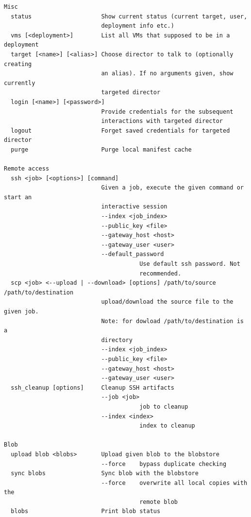\begin{adjustwidth}{2.5em}{2.5em}
\begin{verbatim}
Misc
  status                    Show current status (current target, user, 
                            deployment info etc.) 
  vms [<deployment>]        List all VMs that supposed to be in a deployment 
  target [<name>] [<alias>] Choose director to talk to (optionally creating 
                            an alias). If no arguments given, show currently 
                            targeted director 
  login [<name>] [<password>] 
                            Provide credentials for the subsequent 
                            interactions with targeted director 
  logout                    Forget saved credentials for targeted director 
  purge                     Purge local manifest cache 

Remote access
  ssh <job> [<options>] [command] 
                            Given a job, execute the given command or start an 
                            interactive session 
                            --index <job_index> 
                            --public_key <file> 
                            --gateway_host <host> 
                            --gateway_user <user> 
                            --default_password 
                                       Use default ssh password. Not 
                                       recommended. 
  scp <job> <--upload | --download> [options] /path/to/source /path/to/destination 
                            upload/download the source file to the given job. 
                            Note: for dowload /path/to/destination is a 
                            directory 
                            --index <job_index> 
                            --public_key <file> 
                            --gateway_host <host> 
                            --gateway_user <user> 
  ssh_cleanup [options]     Cleanup SSH artifacts 
                            --job <job> 
                                       job to cleanup 
                            --index <index> 
                                       index to cleanup 

Blob
  upload blob <blobs>       Upload given blob to the blobstore 
                            --force    bypass duplicate checking 
  sync blobs                Sync blob with the blobstore 
                            --force    overwrite all local copies with the 
                                       remote blob 
  blobs                     Print blob status 

\end{verbatim}
\end{adjustwidth}

